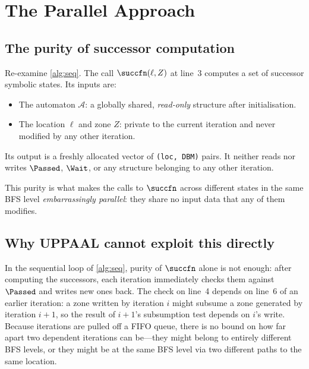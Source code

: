 \section{The Parallel Approach}\label{sec:approach}

\subsection{The purity of successor computation}

Re-examine \cref{alg:seq}.  The call $\succfn(\ell, Z)$ at line~3 computes a
set of successor symbolic states.  Its inputs are:
\begin{itemize}
  \item The automaton $\mathcal{A}$: a globally shared, \emph{read-only}
        structure after initialisation.
  \item The location $\ell$ and zone $Z$: private to the current iteration
        and never modified by any other iteration.
\end{itemize}
Its output is a freshly allocated vector of \texttt{(loc, DBM)} pairs.
It neither reads nor writes $\Passed$, $\Wait$, or any structure belonging to
any other iteration.

\begin{center}
\end{center}

\noindent
This purity is what makes the calls to $\succfn$ across different states
in the same BFS level \emph{embarrassingly parallel}: they share no
input data that any of them modifies.

\subsection{Why UPPAAL cannot exploit this directly}

In the sequential loop of \cref{alg:seq}, purity of $\succfn$ alone is not
enough: after computing the successors, each iteration immediately checks
them against $\Passed$ and writes new ones back.  The check on line~4 depends
on line~6 of an earlier iteration: a zone written by iteration $i$ might
subsume a zone generated by iteration $i+1$, so the result of $i+1$'s
subsumption test depends on $i$'s write.  Because iterations are pulled off a
FIFO queue, there is no bound on how far apart two dependent iterations can
be---they might belong to entirely different BFS levels, or they might be at
the same BFS level via two different paths to the same location.

